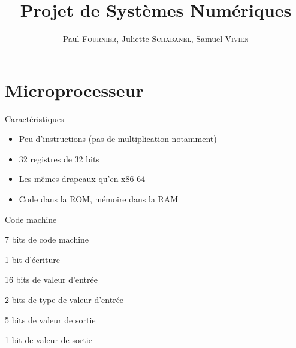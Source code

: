 \documentclass[intlimits, 10pt]{beamer}
\title[\textsc{Ernest'O'Clock}]{Projet de Systèmes Numériques}
\date{}
\author[\textsc{Fournier}, \textsc{Schabanel}, \textsc{Vivien}]{Paul \textsc{Fournier}, Juliette \textsc{Schabanel}, Samuel \textsc{Vivien}}
\begin{document}
	
	\maketitle	
	
	\begin{frame}
		\tableofcontents
	\end{frame}
	
	\section{Microprocesseur}
	
	\begin{frame}{Caractéristiques}
		\begin{itemize}
			\item Peu d'instructions (pas de multiplication notamment)
			\item 32 registres de 32 bits
			\item Les mêmes drapeaux qu'en x86-64
			\item Code dans la ROM, mémoire dans la RAM
		\end{itemize}
	\end{frame}

	\begin{frame}{Code machine}
		\item 7 bits de code machine
		\item 1 bit d'écriture
		\item 16 bits de valeur d'entrée
		\item 2 bits de type de valeur d'entrée
		\item 5 bits de valeur de sortie
		\item 1 bit de valeur de sortie
	\end{frame}
\end{document}
